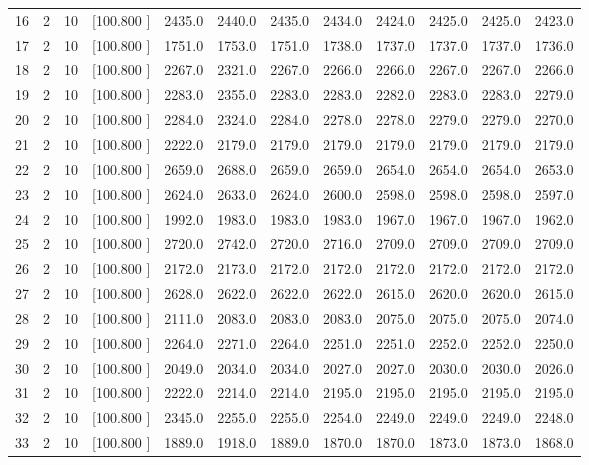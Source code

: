 \documentclass[12pt,a4paper]{article}
\begin{document}
\begin{center}
{\begin{tabular}{r r r r r r r r r r r r}
  16&  2& 10&[100.800   ]&  2435.0&  2440.0&  2435.0&  2434.0&  2424.0&  2425.0&  2425.0&  2423.0\\[-0.02in]
  17&  2& 10&[100.800   ]&  1751.0&  1753.0&  1751.0&  1738.0&  1737.0&  1737.0&  1737.0&  1736.0\\[-0.02in]
  18&  2& 10&[100.800   ]&  2267.0&  2321.0&  2267.0&  2266.0&  2266.0&  2267.0&  2267.0&  2266.0\\[-0.02in]
  19&  2& 10&[100.800   ]&  2283.0&  2355.0&  2283.0&  2283.0&  2282.0&  2283.0&  2283.0&  2279.0\\[-0.02in]
  20&  2& 10&[100.800   ]&  2284.0&  2324.0&  2284.0&  2278.0&  2278.0&  2279.0&  2279.0&  2270.0\\[-0.02in]
  21&  2& 10&[100.800   ]&  2222.0&  2179.0&  2179.0&  2179.0&  2179.0&  2179.0&  2179.0&  2179.0\\[-0.02in]
  22&  2& 10&[100.800   ]&  2659.0&  2688.0&  2659.0&  2659.0&  2654.0&  2654.0&  2654.0&  2653.0\\[-0.02in]
  23&  2& 10&[100.800   ]&  2624.0&  2633.0&  2624.0&  2600.0&  2598.0&  2598.0&  2598.0&  2597.0\\[-0.02in]
  24&  2& 10&[100.800   ]&  1992.0&  1983.0&  1983.0&  1983.0&  1967.0&  1967.0&  1967.0&  1962.0\\[-0.02in]
  25&  2& 10&[100.800   ]&  2720.0&  2742.0&  2720.0&  2716.0&  2709.0&  2709.0&  2709.0&  2709.0\\[-0.02in]
  26&  2& 10&[100.800   ]&  2172.0&  2173.0&  2172.0&  2172.0&  2172.0&  2172.0&  2172.0&  2172.0\\[-0.02in]
  27&  2& 10&[100.800   ]&  2628.0&  2622.0&  2622.0&  2622.0&  2615.0&  2620.0&  2620.0&  2615.0\\[-0.02in]
  28&  2& 10&[100.800   ]&  2111.0&  2083.0&  2083.0&  2083.0&  2075.0&  2075.0&  2075.0&  2074.0\\[-0.02in]
  29&  2& 10&[100.800   ]&  2264.0&  2271.0&  2264.0&  2251.0&  2251.0&  2252.0&  2252.0&  2250.0\\[-0.02in]
  30&  2& 10&[100.800   ]&  2049.0&  2034.0&  2034.0&  2027.0&  2027.0&  2030.0&  2030.0&  2026.0\\[-0.02in]
  31&  2& 10&[100.800   ]&  2222.0&  2214.0&  2214.0&  2195.0&  2195.0&  2195.0&  2195.0&  2195.0\\[-0.02in]
  32&  2& 10&[100.800   ]&  2345.0&  2255.0&  2255.0&  2254.0&  2249.0&  2249.0&  2249.0&  2248.0\\[-0.02in]
  33&  2& 10&[100.800   ]&  1889.0&  1918.0&  1889.0&  1870.0&  1870.0&  1873.0&  1873.0&  1868.0\\[-0.02in]

\end{tabular}}
\end{center}
\end{document}

